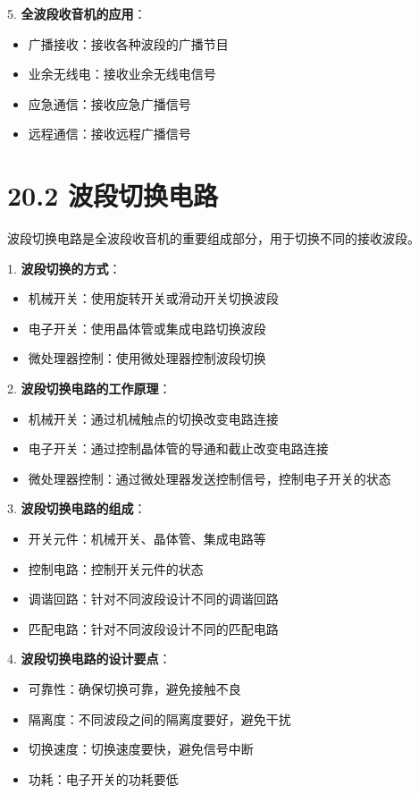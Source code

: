 \documentclass[12pt,UTF8]{ctexbook}
\begin{document}
5. \textbf{全波段收音机的应用}：
   \begin{itemize}[leftmargin=3.5em]
   \item 广播接收：接收各种波段的广播节目
   \item 业余无线电：接收业余无线电信号
   \item 应急通信：接收应急广播信号
   \item 远程通信：接收远程广播信号
   \end{itemize}

\section*{20.2 波段切换电路}

波段切换电路是全波段收音机的重要组成部分，用于切换不同的接收波段。

1. \textbf{波段切换的方式}：
   \begin{itemize}[leftmargin=3.5em]
   \item 机械开关：使用旋转开关或滑动开关切换波段
   \item 电子开关：使用晶体管或集成电路切换波段
   \item 微处理器控制：使用微处理器控制波段切换
   \end{itemize}

2. \textbf{波段切换电路的工作原理}：
   \begin{itemize}[leftmargin=3.5em]
   \item 机械开关：通过机械触点的切换改变电路连接
   \item 电子开关：通过控制晶体管的导通和截止改变电路连接
   \item 微处理器控制：通过微处理器发送控制信号，控制电子开关的状态
   \end{itemize}

3. \textbf{波段切换电路的组成}：
   \begin{itemize}[leftmargin=3.5em]
   \item 开关元件：机械开关、晶体管、集成电路等
   \item 控制电路：控制开关元件的状态
   \item 调谐回路：针对不同波段设计不同的调谐回路
   \item 匹配电路：针对不同波段设计不同的匹配电路
   \end{itemize}

4. \textbf{波段切换电路的设计要点}：
   \begin{itemize}[leftmargin=3.5em]
   \item 可靠性：确保切换可靠，避免接触不良
   \item 隔离度：不同波段之间的隔离度要好，避免干扰
   \item 切换速度：切换速度要快，避免信号中断
   \item 功耗：电子开关的功耗要低
   \end{itemize}
\end{document}
